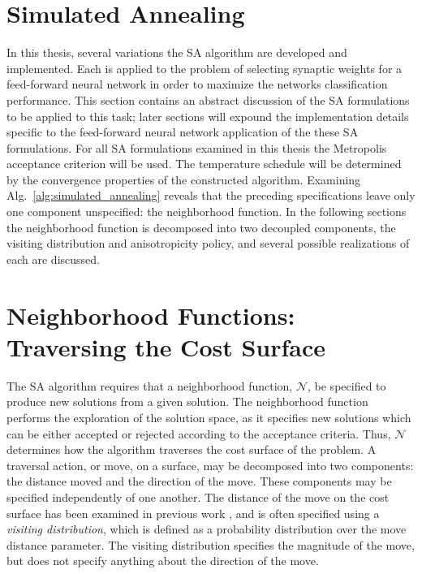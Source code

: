 \documentclass[11pt]{afthesis}
\begin{document}
	\section{Simulated Annealing}
	\label{scn:simulated_annealing}
	
	In this thesis, several variations the SA algorithm are developed and implemented. Each is applied to the problem of selecting synaptic weights for a feed-forward neural network in order to maximize the networks classification performance. This section contains an abstract discussion of the SA formulations to be applied to this task; later sections will expound the implementation details specific to the feed-forward neural network application of the these SA formulations. For all SA formulations examined in this thesis the Metropolis acceptance criterion will be used. The temperature schedule will be determined by the convergence properties of the constructed algorithm. Examining Alg.~\ref{alg:simulated_annealing} reveals that the preceding specifications leave only one component unspecified: the neighborhood function. In the following sections the neighborhood function is decomposed into two decoupled components, the visiting distribution and anisotropicity policy, and several possible realizations of each are discussed.
	
	\section{Neighborhood Functions: Traversing the Cost Surface}
	
	The SA algorithm requires that a neighborhood function, \begin{math} \mathcal{N} \end{math}, be specified to produce new solutions from a given solution. The neighborhood function performs the exploration of the solution space, as it specifies new solutions which can be either accepted or rejected according to the acceptance criteria. Thus, \begin{math} \mathcal{N} \end{math} determines how the algorithm traverses the cost surface of the problem. A traversal action, or move, on a surface, may be decomposed into two components: the distance moved and the direction of the move. These components may be specified independently of one another. The distance of the move on the cost surface has been examined in previous work \cite{szu1987fastsimulatedannealing,tsallis1996generalizedsimulatedannealing,ingber1989veryfastsimulatedreannealing}, and is often specified using a \textit{visiting distribution}, which is defined as a probability distribution over the move distance parameter. The visiting distribution specifies the magnitude of the move, but does not specify anything about the direction of the move. 
	
\end{document}

